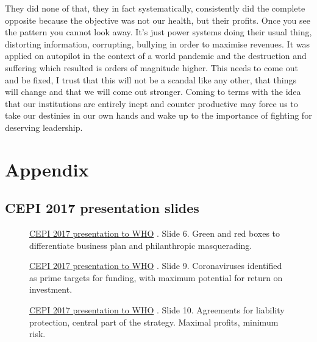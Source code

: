 \documentclass[11pt,a4paper,notitlepage]{report}
\begin{document}
They did none of that, they in fact systematically, consistently did the complete opposite because the objective was not our health, but their profits. Once you see the pattern you cannot look away. It's just power systems doing their usual thing, distorting information, corrupting, bullying in order to maximise revenues. It was applied on autopilot in the context of a world pandemic and the destruction and suffering which resulted is orders of magnitude higher. This needs to come out and be fixed, I trust that this will not be a scandal like any other, that things will change and that we will come out stronger. Coming to terms with the idea that our institutions are entirely inept and counter productive may force us to take our destinies in our own hands and wake up to the importance of fighting for deserving leadership.



\clearpage

\section*{Appendix}

\subsection*{CEPI 2017 presentation slides}

\begin{figure}[h]
    \centering
    \caption{\href{https://www.who.int/medicines/ebola-treatment/TheCoalitionEpidemicPreparednessInnovations-an-overview.pdf}{CEPI 2017 presentation to WHO} \cite{cepi072017}. Slide 6. Green and red boxes to differentiate business plan and philanthropic masquerading.}
    \label{fig:CEPI-slide-6}
\end{figure}

\begin{figure}[h]
    \centering
    \caption{\href{https://www.who.int/medicines/ebola-treatment/TheCoalitionEpidemicPreparednessInnovations-an-overview.pdf}{CEPI 2017 presentation to WHO} \cite{cepi072017}. Slide 9. Coronaviruses identified as prime targets for funding, with maximum potential for return on investment.}
    \label{fig:CEPI-slide-9}
\end{figure}

\begin{figure}[h]
    \centering
    \caption{\href{https://www.who.int/medicines/ebola-treatment/TheCoalitionEpidemicPreparednessInnovations-an-overview.pdf}{CEPI 2017 presentation to WHO} \cite{cepi072017}. Slide 10. Agreements for liability protection, central part of the strategy. Maximal profits, minimum risk.}
    \label{fig:CEPI-slide-10}
\end{figure}
\end{document}
